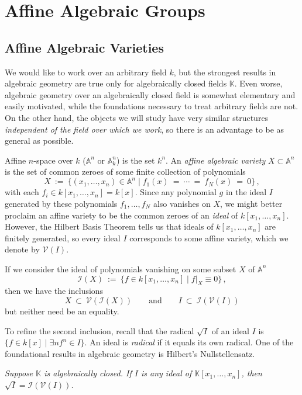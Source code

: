 \documentclass[12pt]{amsart}
\begin{document}
\section{Affine Algebraic Groups}

\subsection{Affine Algebraic Varieties}
We would like to work over an arbitrary field $k$, but the strongest results
in algebraic geometry are true only for algebraically closed fields
${\mathbb K}$. 
Even worse, algebraic geometry over an algebraically closed field  is
somewhat elementary and easily motivated, while the foundations necessary to
treat arbitrary fields are not.
On the other hand, the objects we will study have very similar structures
{\sl independent of the field over which we work}, so there is an advantage
to be as general as possible.

Affine $n$-space over $k$ (${\mathbb A}^n$ or ${\mathbb A}^n_k$) is the set 
$k^n$.
An {\sl affine algebraic variety} $X\subset {\mathbb A}^n$ is the set of
common zeroes of some finite collection of polynomials
$$
   X\ :=\ \{(x_1,\ldots,x_n)\in{\mathbb A}^n \mid 
   f_1(x)\ =\ \cdots\ =\ f_N(x)\ =\ 0\}\,,
$$
with each $f_i\in k[x_1,\ldots,x_n]=k[x]$.
Since any polynomial $g$ in the ideal $I$ generated by these
polynomials $f_1,\ldots,f_N$ also vanishes on $X$, we might better proclaim
an affine variety to be the common zeroes of an {\sl ideal} of 
$k[x_1,\ldots,x_n]$.
However, the Hilbert Basis Theorem tells us that ideals of 
$k[x_1,\ldots,x_n]$ are finitely generated, so every ideal 
$I$ corresponds to some affine variety, which we denote by 
${\mathcal V}(I)$.

If we consider the ideal of polynomials vanishing on some subset $X$ of
${\mathbb A}^n$
$$
  {\mathcal I}(X)\ :=\ 
         \{ f\in k[x_1,\ldots,x_n]\mid f|_X\equiv 0\}\,,
$$
then we have the inclusions
$$
  X\ \subset\ {\mathcal V}({\mathcal I}(X))
  \qquad\mbox{and}\qquad
  I\ \subset\ {\mathcal I}({\mathcal V}(I))
$$
but neither need be an equality.

To refine the second inclusion, recall that the radical $\sqrt{I}$ of an
ideal $I$ is $\{f\in k[x]\mid \exists n f^n\in I\}$.
An ideal is {\it radical} if it equals its own radical.
One of the foundational results in algebraic geometry is Hilbert's
Nullstellensatz.\medskip

{\it Suppose ${\mathbb K}$ is algebraically closed.
If $I$ is any ideal of ${\mathbb K}[x_1,\ldots,x_n]$, then 
$\sqrt{I}={\mathcal I}({\mathcal V}(I))$.}
\medskip
\end{document}
